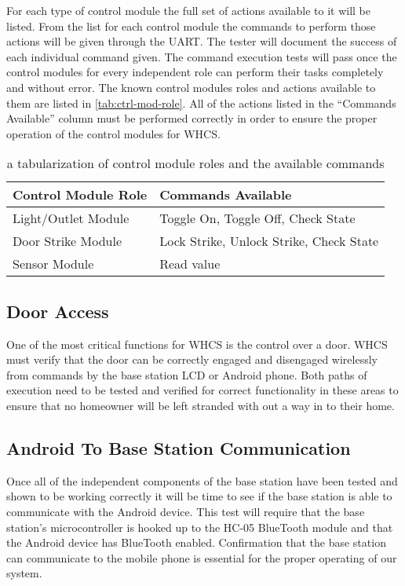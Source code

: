 For each type of control module the full set of actions available to it will be
listed. From the list for each control module the commands to perform those
actions will be given through the UART. The tester will document the success of
each individual command given. The command execution tests will pass once the
control modules for every independent role can perform their tasks completely
and without error. The known control modules roles and actions available to
them are listed in \autoref{tab:ctrl-mod-role}. All of the actions listed in the
{}``Commands Available{}'' column must be performed correctly in order to
ensure the proper operation of the control modules for WHCS.

\begin{table}[H]
\centering
\begin{tabular}{|l|l|}
\hline
{\color{black} Control Module Role} &
{\color{black} Commands Available}\\\hline
{\color{black} Light/Outlet Module} &
{\color{black} Toggle On},
{\color{black} Toggle Off},
{\color{black} Check State}
\\\hline
{\color{black} Door Strike Module} &
{\color{black} Lock Strike},
{\color{black} Unlock Strike},
{\color{black} Check State}
\\\hline
{\color{black} Sensor Module} &
{\color{black} Read value}
\\\hline
\end{tabular}
\caption{a tabularization of control module roles and the available commands}
\label{tab:ctrl-mod-role}
\end{table}

\subsection{Door Access}
One of the most critical functions for WHCS is the control over a door.
WHCS must verify that the door can be correctly engaged and disengaged
wirelessly from commands by the base station LCD or Android phone. Both paths
of execution need to be tested and verified for correct functionality in these
areas to ensure that no homeowner will be left stranded with out a way in to
their home.

\subsection{Android To Base Station Communication}
Once all of the independent components of the base station have been tested and
shown to be working correctly it will be time to see if the base station is
able to communicate with the Android device. This test will require that the
base station{}'s microcontroller is hooked up to the HC{}-05 BlueTooth module
and that the Android device has BlueTooth enabled. Confirmation that the base
station can communicate to the mobile phone is essential for the proper
operating of our system.

